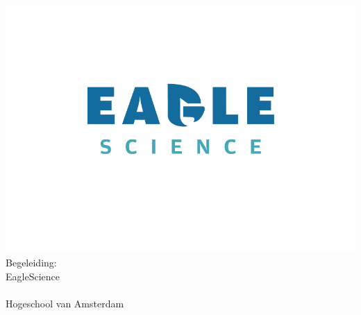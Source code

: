 
\begin{titlepage}

    \begin{addmargin}[-1cm]{-3cm}
        \begin{center}
            \large

            \hfill
            \vfill

            \begingroup
            {\color[HTML]{27406B}\spacedallcaps {\Huge\myTitle} \\ \bigskip} %
            {\color[HTML]{84C6C8}\Large\mySubtitle \\ \medskip}

            \endgroup
            \spacedlowsmallcaps{\large\myName} %

            \vfill

            \includegraphics[width=15cm]{gfx/EagleScience_Logo_on_white} \\  %


            Begeleiding:\\
            EagleScience\\
            \myStagebegeleider \\
            \bigskip
            Hogeschool van Amsterdam\\
            \myHvABegeleider \\ \bigskip \bigskip \bigskip


            \myTime %

            \vfill

        \end{center}
    \end{addmargin}

\end{titlepage}
